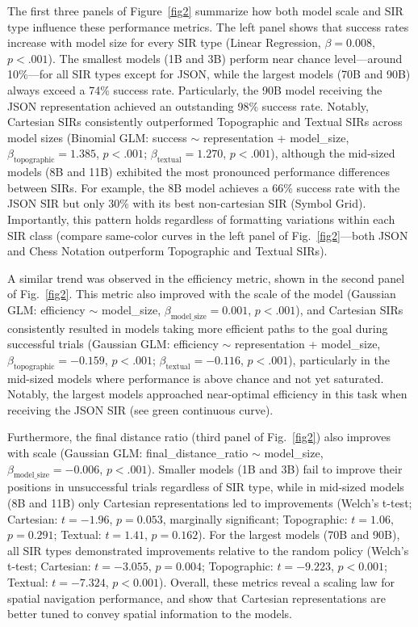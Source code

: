 \documentclass[runningheads]{llncs}
\begin{document}
The first three panels of Figure~\ref{fig2} summarize how both model scale and SIR type influence these performance metrics. The left panel shows that success rates increase with model size for every SIR type (Linear Regression, $\beta = 0.008$, $p < .001$). The smallest models (1B and 3B) perform near chance level---around 10\%---for all SIR types except for JSON, while the largest models (70B and 90B) always exceed a 74\% success rate. Particularly, the 90B model receiving the JSON representation achieved an outstanding 98\% success rate. Notably, Cartesian SIRs consistently outperformed Topographic and Textual SIRs across model sizes (Binomial GLM: success $\sim$ representation + model\_size, $\beta_{\text{topographic}} = 1.385$, $p < .001$; $\beta_{\text{textual}} = 1.270$, $p < .001$), although the mid-sized models (8B and 11B) exhibited the most pronounced performance differences between SIRs. For example, the 8B model achieves a 66\% success rate with the JSON SIR but only 30\% with its best non-cartesian SIR (Symbol Grid). Importantly, this pattern holds regardless of formatting variations within each SIR class (compare same-color curves in the left panel of Fig.~\ref{fig2}---both JSON and Chess Notation outperform Topographic and Textual SIRs).

A similar trend was observed in the efficiency metric, shown in the second panel of Fig.~\ref{fig2}. This metric also improved with the scale of the model (Gaussian GLM: efficiency $\sim$ model\_size, $\beta_{\text{model\_size}} = 0.001$, $p < .001$), and Cartesian SIRs consistently resulted in models taking more efficient paths to the goal during successful trials (Gaussian GLM: efficiency $\sim$ representation + model\_size, $\beta_{\text{topographic}} = -0.159$, $p < .001$; $\beta_{\text{textual}} = -0.116$, $p < .001$), particularly in the mid-sized models where performance is above chance and not yet saturated. Notably, the largest models approached near-optimal efficiency in this task when receiving the JSON SIR (see green continuous curve).

Furthermore, the final distance ratio (third panel of Fig.~\ref{fig2}) also improves with scale (Gaussian GLM: final\_distance\_ratio $\sim$ model\_size, $\beta_{\text{model\_size}} = -0.006$, $p < .001$). Smaller models (1B and 3B) fail to improve their positions in unsuccessful trials regardless of SIR type, while in mid-sized models (8B and 11B) only Cartesian representations led to improvements (Welch’s t-test; Cartesian: $t = -1.96$, $p = 0.053$, marginally significant; Topographic: $t = 1.06$, $p = 0.291$; Textual: $t = 1.41$, $p = 0.162$). For the largest models (70B and 90B), all SIR types demonstrated improvements relative to the random policy (Welch’s t-test; Cartesian: $t = -3.055$, $p = 0.004$; Topographic: $t = -9.223$, $p < 0.001$; Textual: $t = -7.324$, $p < 0.001$). Overall, these metrics reveal a scaling law for spatial navigation performance, and show that Cartesian representations are better tuned to convey spatial information to the models.
\end{document}
